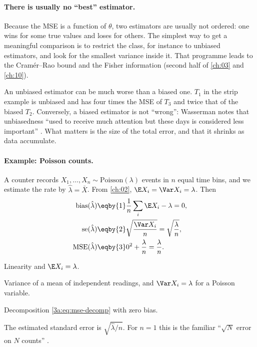 \paragraph{There is usually no ``best'' estimator.}
Because the MSE is a function of $\theta$, two estimators are usually not
ordered: one wins for some true values and loses for others. The simplest
way to get a meaningful comparison is to restrict the class, for instance
to unbiased estimators, and look for the smallest variance inside it. That
programme leads to the Cram\'er--Rao bound and the Fisher information
(second half of \cref{ch:03} and \cref{ch:10}).

\begin{pitfall}
An unbiased estimator can be much worse than a biased one. $T_1$ in the strip
example is unbiased and has four times the MSE of $T_3$ and twice that of
the biased $T_2$. Conversely, a biased estimator is not ``wrong'': Wasserman
notes that unbiasedness ``used to receive much attention but these days is
considered less important'' . What matters is the size of
the total error, and that it shrinks as data accumulate.
\end{pitfall}

\paragraph{Example: Poisson counts.}
\label{3a:ex:poisson}
A counter records $X_1,\dots,X_n\sim\mathrm{Poisson}(\lambda)$ events in $n$
equal time bins, and we estimate the rate by $\hat\lambda=\bar X$. From
\cref{ch:02}, $\E X_i=\Var X_i=\lambda$. Then
\begin{align*}
  \operatorname{bias}(\hat\lambda) &\eqby{1} \frac1n\sum_i\E X_i-\lambda=0,\\
  \operatorname{se}(\hat\lambda) &\eqby{2} \sqrt{\frac{\Var X_i}{n}}=\sqrt{\frac\lambda n},\\
  \operatorname{MSE}(\hat\lambda) &\eqby{3} 0^2+\frac\lambda n=\frac\lambda n .
\end{align*}
\begin{explain}
  \item Linearity and $\E X_i=\lambda$.
  \item Variance of a mean of independent readings, and $\Var X_i=\lambda$ for a Poisson variable.
  \item Decomposition \eqref{3a:eq:mse-decomp} with zero bias.
\end{explain}
The estimated standard error is $\sqrt{\hat\lambda/n}$. For $n=1$ this is the
familiar ``$\sqrt N$ error on $N$ counts'' .

